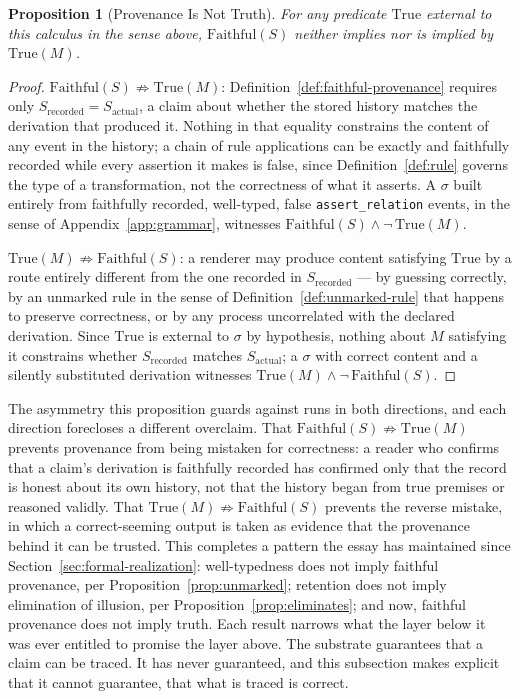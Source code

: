 \documentclass[11pt]{article}
\newtheorem{proposition}[theorem]{Proposition}
\theoremstyle{definition}
\begin{document}
\begin{proposition}[Provenance Is Not Truth]
\label{prop:provenance-not-truth}
For any predicate $\mathrm{True}$ external to this calculus in the sense above, $\mathrm{Faithful}(S)$ neither implies nor is implied by $\mathrm{True}(M)$.
\end{proposition}

\begin{proof}
$\mathrm{Faithful}(S) \not\Rightarrow \mathrm{True}(M)$: Definition~\ref{def:faithful-provenance} requires only $S_{\mathrm{recorded}} = S_{\mathrm{actual}}$, a claim about whether the stored history matches the derivation that produced it. Nothing in that equality constrains the content of any event in the history; a chain of rule applications can be exactly and faithfully recorded while every assertion it makes is false, since Definition~\ref{def:rule} governs the type of a transformation, not the correctness of what it asserts. A $\sigma$ built entirely from faithfully recorded, well-typed, false \texttt{assert\_relation} events, in the sense of Appendix~\ref{app:grammar}, witnesses $\mathrm{Faithful}(S) \wedge \neg\,\mathrm{True}(M)$.

$\mathrm{True}(M) \not\Rightarrow \mathrm{Faithful}(S)$: a renderer may produce content satisfying $\mathrm{True}$ by a route entirely different from the one recorded in $S_{\mathrm{recorded}}$ --- by guessing correctly, by an unmarked rule in the sense of Definition~\ref{def:unmarked-rule} that happens to preserve correctness, or by any process uncorrelated with the declared derivation. Since $\mathrm{True}$ is external to $\sigma$ by hypothesis, nothing about $M$ satisfying it constrains whether $S_{\mathrm{recorded}}$ matches $S_{\mathrm{actual}}$; a $\sigma$ with correct content and a silently substituted derivation witnesses $\mathrm{True}(M) \wedge \neg\,\mathrm{Faithful}(S)$.
\end{proof}

The asymmetry this proposition guards against runs in both directions, and each direction forecloses a different overclaim. That $\mathrm{Faithful}(S) \not\Rightarrow \mathrm{True}(M)$ prevents provenance from being mistaken for correctness: a reader who confirms that a claim's derivation is faithfully recorded has confirmed only that the record is honest about its own history, not that the history began from true premises or reasoned validly. That $\mathrm{True}(M) \not\Rightarrow \mathrm{Faithful}(S)$ prevents the reverse mistake, in which a correct-seeming output is taken as evidence that the provenance behind it can be trusted. This completes a pattern the essay has maintained since Section~\ref{sec:formal-realization}: well-typedness does not imply faithful provenance, per Proposition~\ref{prop:unmarked}; retention does not imply elimination of illusion, per Proposition~\ref{prop:eliminates}; and now, faithful provenance does not imply truth. Each result narrows what the layer below it was ever entitled to promise the layer above. The substrate guarantees that a claim can be traced. It has never guaranteed, and this subsection makes explicit that it cannot guarantee, that what is traced is correct.
\end{document}
